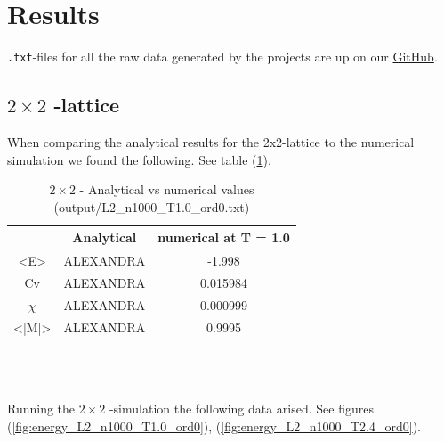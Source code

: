\documentclass{article}
\begin{document}
\vspace{1cm}

\section{Results} \label{sec:Results}

  \texttt{.txt}-files for all the raw data generated by the projects are up on our \href{https://github.com/Erikbgram/Fys3150}{GitHub}. \\

\subsection{\texorpdfstring{ $2 \times 2$ }{text}-lattice}

When comparing the analytical results for the 2x2-lattice to the numerical simulation we found the following. See table (\ref{tab:analyticalvsnumerical}).

  \begin{table}[ht]
    \centering
    \caption{\texorpdfstring{ $2 \times 2$ }{text} - Analytical vs numerical values (output/L2\_n1000\_T1.0\_ord0.txt)}
    \vspace{2mm}
    \label{tab:analyticalvsnumerical}
    \begin{tabular}{|c|c|c|}
        \hline
         & Analytical & numerical at T = 1.0\\
        \hline \hline
        <E> & ALEXANDRA & -1.998 \\
        Cv & ALEXANDRA & 0.015984 \\
        $\chi$ & ALEXANDRA & 0.000999 \\
        <|M|> & ALEXANDRA & 0.9995 \\
        \hline
    \end{tabular} \\
    \hspace{0pt}\\
  \end{table}

Running the \texorpdfstring{ $2 \times 2$ }{text}-simulation the following data arised. See figures (\ref{fig:energy_L2_n1000_T1.0_ord0}), (\ref{fig:energy_L2_n1000_T2.4_ord0}).
\end{document}
